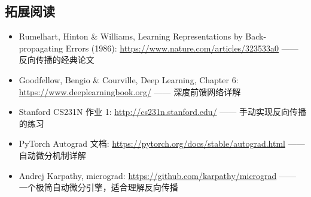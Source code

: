 \documentclass[a4paper]{article}
\begin{document}
\subsection{拓展阅读}

\begin{itemize}
    \item Rumelhart, Hinton \& Williams, Learning Representations by Back-propagating Errors (1986): \url{https://www.nature.com/articles/323533a0} —— 反向传播的经典论文
    \item Goodfellow, Bengio \& Courville, Deep Learning, Chapter 6: \url{https://www.deeplearningbook.org/} —— 深度前馈网络详解
    \item Stanford CS231N 作业 1: \url{http://cs231n.stanford.edu/} —— 手动实现反向传播的练习
    \item PyTorch Autograd 文档: \url{https://pytorch.org/docs/stable/autograd.html} —— 自动微分机制详解
    \item Andrej Karpathy, micrograd: \url{https://github.com/karpathy/micrograd} —— 一个极简自动微分引擎，适合理解反向传播
\end{itemize}
\end{document}
